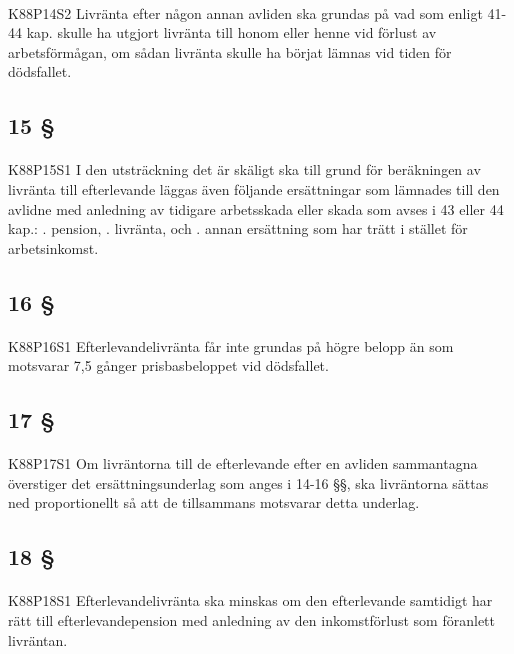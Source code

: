 \documentclass[a4paper,notitlepage,openany,10pt]{book}
\begin{document}
\paragraph*{}
{\tiny K88P14S2}
Livränta efter någon annan avliden ska grundas på vad som enligt 41-44 kap. skulle ha utgjort livränta till honom eller henne vid förlust av arbetsförmågan, om sådan livränta skulle ha börjat lämnas vid tiden för dödsfallet.
\subsection*{15 §}
\paragraph*{}
{\tiny K88P15S1}
I den utsträckning det är skäligt ska till grund för beräkningen av livränta till efterlevande läggas även följande ersättningar som lämnades till den avlidne med anledning av tidigare arbetsskada eller skada som avses i 43 eller 44 kap.:
. pension,
. livränta, och
. annan ersättning som har trätt i stället för arbetsinkomst.
\subsection*{16 §}
\paragraph*{}
{\tiny K88P16S1}
Efterlevandelivränta får inte grundas på högre belopp än som motsvarar 7,5 gånger prisbasbeloppet vid dödsfallet.
\subsection*{17 §}
\paragraph*{}
{\tiny K88P17S1}
Om livräntorna till de efterlevande efter en avliden sammantagna överstiger det ersättningsunderlag som anges i 14-16 §§, ska livräntorna sättas ned proportionellt så att de tillsammans motsvarar detta underlag.
\subsection*{18 §}
\paragraph*{}
{\tiny K88P18S1}
Efterlevandelivränta ska minskas om den efterlevande samtidigt har rätt till efterlevandepension med anledning av den inkomstförlust som föranlett livräntan.
\end{document}
